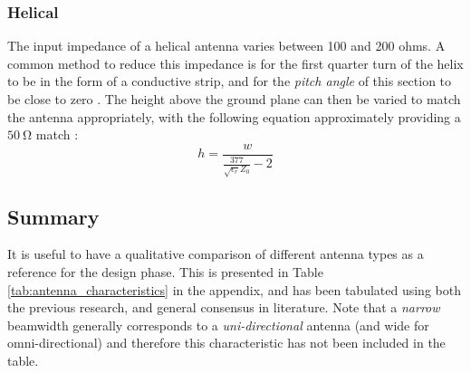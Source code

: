 \subsubsection{Helical}\label{sec:helical_matching}
The input impedance of a helical antenna varies between 100 and 200 ohms. A common method to reduce this impedance is for the first quarter turn of the helix to be in the form of a conductive strip, and for the \textit{pitch angle} of this section to be close to zero \cite{textbook-antennaTheoryAnalysisDesign}. The height above the ground plane can then be varied to match the antenna appropriately, with the following equation approximately providing a $\SI{50}{\ohm}$ match \cite{textbook-antennaTheoryAnalysisDesign}:
$$h = \frac{w}{\frac{377}{\sqrt{\epsilon_r} Z_0} - 2}$$

\subsection{Summary}
It is useful to have a qualitative comparison of different antenna types as a reference for the design phase. This is presented in Table \ref{tab:antenna_characteristics} in the appendix, and has been tabulated using both the previous research, and general consensus in literature. Note that a \textit{narrow} beamwidth generally corresponds to a \textit{uni-directional} antenna (and wide for omni-directional) and therefore this characteristic has not been included in the table.